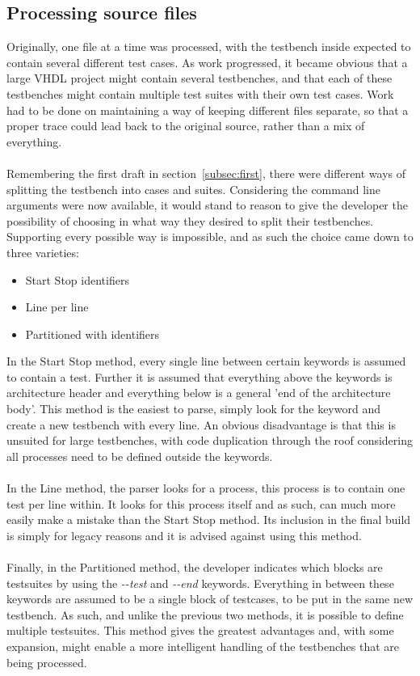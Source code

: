 \documentclass[11pt,british]{article}
\begin{document}
\subsection{Processing source files}
Originally, one file at a time was processed, with the testbench inside expected to contain several different test cases. As work progressed, it became obvious that a large \gls{VHDL} project might contain several testbenches, and that each of these testbenches might contain multiple test suites with their own test cases. Work had to be done on maintaining a way of keeping different files separate, so that a proper trace could lead back to the original source, rather than a mix of everything. \\
\\
Remembering the first draft in section~\ref{subsec:first}, there were different ways of splitting the testbench into cases and suites. Considering the command line arguments were now available, it would stand to reason to give the developer the possibility of choosing in what way they desired to split their testbenches. Supporting every possible way is impossible, and as such the choice came down to three varieties:
\begin{itemize}[itemsep=-0.1cm]
\item Start Stop identifiers
\item Line per line 
\item Partitioned with identifiers
\end{itemize}
In the Start Stop method, every single line between certain keywords is assumed to contain a test. Further it is assumed that everything above the keywords is architecture header and everything below is a general 'end of the architecture body'. This method is the easiest to parse, simply look for the keyword and create a new testbench with every line. An obvious disadvantage is that this is unsuited for large testbenches, with code duplication through the roof considering all processes need to be defined outside the keywords.\\
\\
In the Line method, the parser looks for a process, this process is to contain one test per line within. It looks for this process itself and as such, can much more easily make a mistake than the Start Stop method. Its inclusion in the final build is simply for legacy reasons and it is advised against using this method.\\
\\
Finally, in the Partitioned method, the developer indicates which blocks are testsuites by using the \emph{-\--test} and \emph{-\--end} keywords. Everything in between these keywords are assumed to be a single block of testcases, to be put in the same new testbench. As such, and unlike the previous two methods, it is possible to define multiple testsuites.  This method gives the greatest advantages and, with some expansion, might enable a more intelligent handling of the testbenches that are being processed.
\end{document}

